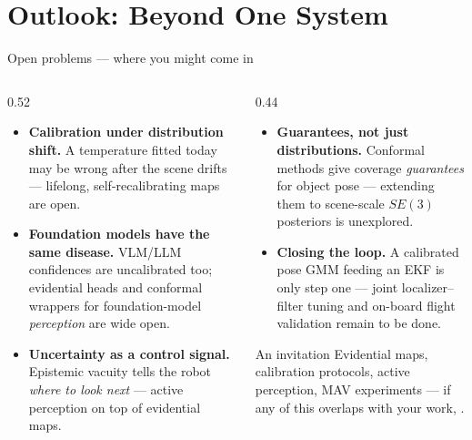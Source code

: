 \documentclass[aspectratio=169,10pt]{beamer}
\begin{document}
\section{Outlook: Beyond One System}

\begin{frame}{Open problems --- where you might come in}
  \begin{columns}[T]
    \begin{column}{0.52\textwidth}
      \begin{itemize}
        \item \textbf{Calibration under distribution shift.} A temperature
              fitted today may be wrong after the scene drifts ---
              lifelong, self-recalibrating maps are open.
        \item \textbf{Foundation models have the same disease.} VLM/LLM
              confidences are uncalibrated too; evidential heads and
              conformal wrappers for foundation-model \emph{perception}
              are wide open.
        \item \textbf{Uncertainty as a control signal.} Epistemic
              vacuity tells the robot \emph{where to look next} ---
              active perception on top of evidential maps.
      \end{itemize}
    \end{column}
    \begin{column}{0.44\textwidth}
      \begin{itemize}
        \item \textbf{Guarantees, not just distributions.} Conformal
              methods give coverage \emph{guarantees} for object pose ---
              extending them to scene-scale $SE(3)$ posteriors is
              unexplored.
        \item \textbf{Closing the loop.} A calibrated pose GMM feeding an
              EKF is only step one --- joint localizer--filter tuning and
              on-board flight validation remain to be done.
      \end{itemize}
      \vspace{2mm}
      \begin{block}{An invitation}
        Evidential maps, calibration protocols, active perception,
        MAV experiments --- if any of this overlaps with your work,
        .
      \end{block}
    \end{column}
  \end{columns}
\end{frame}
\end{document}
